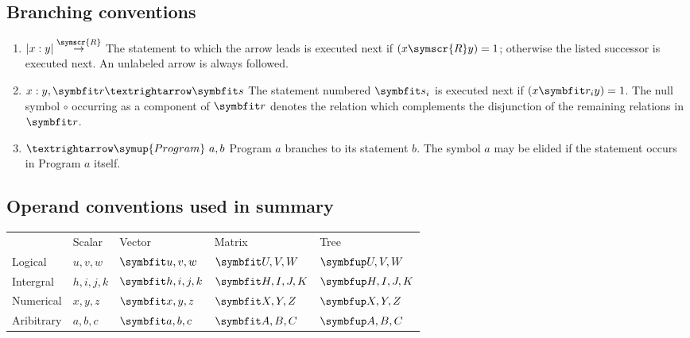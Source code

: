 \subsection{Branching conventions}
\begin{enumerate}[label= (\alph*)]
	\item \( \left| x : y \right| \overset{\symscr{R}}{\rightarrow} \)\newline
	The statement to which the arrow leads is executed next if \( \left( x \symscr{R} y \right) = 1 \); otherwise the listed successor is executed next. An unlabeled arrow is always followed.
	\item \( x:y, \vect{r} → \vect{s} \)\newline
	The statement numbered \( \vect{s}_i \) is executed next if \( \left( x \vect{r}_i y \right) = 1 \). The null symbol \( ∘ \) occurring as a component of \( \vect{r} \) denotes the relation which complements the disjunction of the remaining relations in \( \vect{r} \).
	\item \( → \symup{Program}\ a,b \)\newline
	Program \( a \) branches to its statement \( b \). The symbol \( a \) may be elided if the statement occurs in Program \( a \) itself.
\end{enumerate}

\subsection{Operand conventions used in summary}
\begin{tabularx}{\textwidth}{ l l l l l }
		& Scalar
		& Vector
		& Matrix
		& Tree
		\\
	Logical
		& \( u,v,w \)
		& \( \vect{u,v,w} \)
		& \( \mat{U,V,W} \)
		& \( \tree{U,V,W} \)
		\\
	Intergral
		& \( h,i,j,k \)
		& \( \vect{h,i,j,k} \)
		& \( \mat{H,I,J,K} \)
		& \( \tree{H,I,J,K} \)
		\\
	Numerical
		& \( x,y,z \)
		& \( \vect{x,y,z} \)
		& \( \mat{X,Y,Z} \)
		& \( \tree{X,Y,Z} \)
		\\
	Aribitrary
		& \( a,b,c \)
		& \( \vect{a,b,c} \)
		& \( \mat{A,B,C} \)
		& \( \tree{A,B,C} \)
		\\
\end{tabularx}

